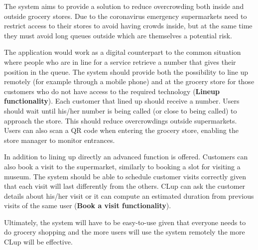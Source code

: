 The system aims to provide a solution to reduce overcrowding both inside and outside grocery stores.
Due to the coronavirus emergency supermarkets need to restrict access to their stores to avoid having crowds inside, but at the same time they must avoid long queues outside which are themselves a potential risk. \newline

The application would work as a digital counterpart to the common situation where people who are in line for a service retrieve a number that gives their position in the queue.
The system should provide both the possibility to line up remotely (for example through a mobile phone) and at the grocery store for those customers who do not have access to the required technology (\textbf{Lineup functionality}).
Each customer that lined up should receive a number. Users should wait until his/her number is being called (or close to being called) to approach the store. This should reduce overcrowdings outside supermarkets.
Users can also scan a QR code when entering the grocery store, enabling the store manager to monitor entrances. \newline

In addition to lining up directly an advanced function is offered. Customers can also book a visit to the supermarket, similarly to booking a slot for visiting a museum. The system should be able to schedule customer visits correctly given that each visit will last differently from the others.  
CLup can ask the customer details about his/her visit or it can compute an estimated duration from previous visits of the same user (\textbf{Book a visit functionality}). \newline

Ultimately, the system will have to be easy-to-use given that everyone needs to do grocery shopping and the more users will use the system remotely the more CLup will be effective.


